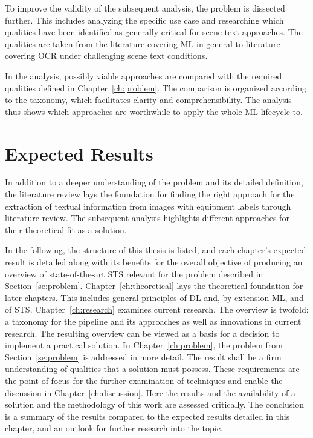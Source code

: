 To improve the validity of the subsequent analysis, the problem is dissected further.
This includes analyzing the specific use case and researching which qualities have been
identified as generally critical for scene text approaches.
The qualities are taken from the literature covering \ac{ML} in general to literature
covering \ac{OCR} under challenging scene text conditions.

In the analysis, possibly viable approaches are compared with the required qualities defined
in Chapter~\ref{ch:problem}.
The comparison is organized according to the taxonomy, which facilitates clarity and
comprehensibility.
The analysis thus shows which approaches are worthwhile to apply the whole \ac{ML} lifecycle to.

\section{Expected Results}
In addition to a deeper understanding of the problem and its detailed definition, the literature
review lays the foundation for finding the right approach for the extraction of textual
information from images with equipment labels through literature review.
The subsequent analysis highlights different approaches for their theoretical fit as a
solution.

In the following, the structure of this thesis is listed, and each chapter's expected
result is detailed along with its benefits for the overall objective of producing an overview of
state-of-the-art \ac{STS} relevant for the problem described in Section~\ref{se:problem}.
Chapter~\ref{ch:theoretical} lays the theoretical foundation for later chapters.
This includes general principles of \ac{DL} and, by extension \ac{ML}, and of \ac{STS}.
Chapter~\ref{ch:research} examines current research.
The overview is twofold: a taxonomy for the pipeline and its approaches as well as innovations in
current research.
The resulting overview can be viewed as a basis for a decision to implement a
practical solution.
In Chapter~\ref{ch:problem}, the problem from Section~\ref{se:problem} is addressed in more detail.
The result shall be a firm understanding of qualities that a solution must possess.
These requirements are the point of focus for the further examination of techniques and
enable the discussion in Chapter~\ref{ch:discussion}.
Here the results and the availability of a solution and the methodology of this work
are assessed critically.
The conclusion is a summary of the results compared to the expected results detailed in this chapter,
and an outlook for further research into the topic.
